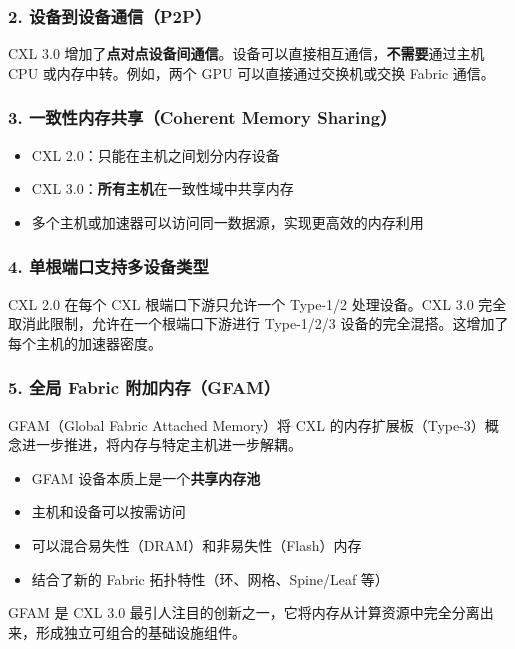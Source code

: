 \documentclass[12pt,a4paper]{article}
\begin{document}
\subsubsection{2. 设备到设备通信（P2P）}

\begin{keypoint}[P2P DMA]
CXL 3.0 增加了\textbf{点对点设备间通信}。设备可以直接相互通信，\textbf{不需要}通过主机 CPU 或内存中转。例如，两个 GPU 可以直接通过交换机或交换 Fabric 通信。
\end{keypoint}

\subsubsection{3. 一致性内存共享（Coherent Memory Sharing）}

\begin{keypoint}[增强一致性]
\begin{itemize}
    \item CXL 2.0：只能在主机之间划分内存设备
    \item CXL 3.0：\textbf{所有主机}在一致性域中共享内存
    \item 多个主机或加速器可以访问同一数据源，实现更高效的内存利用
\end{itemize}
\end{keypoint}

\subsubsection{4. 单根端口支持多设备类型}

CXL 2.0 在每个 CXL 根端口下游只允许一个 Type-1/2 处理设备。CXL 3.0 完全取消此限制，允许在一个根端口下游进行 Type-1/2/3 设备的完全混搭。这增加了每个主机的加速器密度。

\subsubsection{5. 全局 Fabric 附加内存（GFAM）}

\begin{keypoint}
GFAM（Global Fabric Attached Memory）将 CXL 的内存扩展板（Type-3）概念进一步推进，将内存与特定主机进一步解耦。

\begin{itemize}
    \item GFAM 设备本质上是一个\textbf{共享内存池}
    \item 主机和设备可以按需访问
    \item 可以混合易失性（DRAM）和非易失性（Flash）内存
    \item 结合了新的 Fabric 拓扑特性（环、网格、Spine/Leaf 等）
\end{itemize}

GFAM 是 CXL 3.0 最引人注目的创新之一，它将内存从计算资源中完全分离出来，形成独立可组合的基础设施组件。
\end{keypoint}
\end{document}
